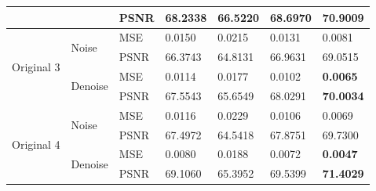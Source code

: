 \begin{center}
\begin{tabular}{llllllllllll|l|l|l|l|l|l|l|l|l|l|l|l|l|}
\multicolumn{4}{|l|}{}                            & \multicolumn{4}{l|}{}                         & \multicolumn{4}{l|}{PSNR} & \multicolumn{3}{l|}{68.2338} & \multicolumn{3}{l|}{66.5220} & \multicolumn{4}{l|}{68.6970}  & \multicolumn{3}{l|}{\textbf{70.9009}} \\ \hline
\multicolumn{4}{|l|}{\multirow{4}{*}{Original 3}} & \multicolumn{4}{l|}{\multirow{2}{*}{Noise}}   & \multicolumn{4}{l|}{MSE}  & \multicolumn{3}{l|}{0.0150}  & \multicolumn{3}{l|}{0.0215}  & \multicolumn{4}{l|}{0.0131}   & \multicolumn{3}{l|}{0.0081}           \\ \cline{9-25} 
\multicolumn{4}{|l|}{}                            & \multicolumn{4}{l|}{}                         & \multicolumn{4}{l|}{PSNR} & \multicolumn{3}{l|}{66.3743} & \multicolumn{3}{l|}{64.8131} & \multicolumn{4}{l|}{66.9631}  & \multicolumn{3}{l|}{69.0515}          \\ \cline{5-25} 
\multicolumn{4}{|l|}{}                            & \multicolumn{4}{l|}{\multirow{2}{*}{Denoise}} & \multicolumn{4}{l|}{MSE}  & \multicolumn{3}{l|}{0.0114}  & \multicolumn{3}{l|}{0.0177}  & \multicolumn{4}{l|}{0.0102}   & \multicolumn{3}{l|}{\textbf{0.0065}}  \\ \cline{9-25} 
\multicolumn{4}{|l|}{}                            & \multicolumn{4}{l|}{}                         & \multicolumn{4}{l|}{PSNR} & \multicolumn{3}{l|}{67.5543} & \multicolumn{3}{l|}{65.6549} & \multicolumn{4}{l|}{68.0291}  & \multicolumn{3}{l|}{\textbf{70.0034}} \\ \hline
\multicolumn{4}{|l|}{\multirow{4}{*}{Original 4}} & \multicolumn{4}{l|}{\multirow{2}{*}{Noise}}   & \multicolumn{4}{l|}{MSE}  & \multicolumn{3}{l|}{0.0116}  & \multicolumn{3}{l|}{0.0229}  & \multicolumn{4}{l|}{0.0106}   & \multicolumn{3}{l|}{0.0069}           \\ \cline{9-25} 
\multicolumn{4}{|l|}{}                            & \multicolumn{4}{l|}{}                         & \multicolumn{4}{l|}{PSNR} & \multicolumn{3}{l|}{67.4972} & \multicolumn{3}{l|}{64.5418} & \multicolumn{4}{l|}{67.8751}  & \multicolumn{3}{l|}{69.7300}          \\ \cline{5-25} 
\multicolumn{4}{|l|}{}                            & \multicolumn{4}{l|}{\multirow{2}{*}{Denoise}} & \multicolumn{4}{l|}{MSE}  & \multicolumn{3}{l|}{0.0080}  & \multicolumn{3}{l|}{0.0188}  & \multicolumn{4}{l|}{0.0072}   & \multicolumn{3}{l|}{\textbf{0.0047}}  \\ \cline{9-25} 
\multicolumn{4}{|l|}{}                            & \multicolumn{4}{l|}{}                         & \multicolumn{4}{l|}{PSNR} & \multicolumn{3}{l|}{69.1060} & \multicolumn{3}{l|}{65.3952} & \multicolumn{4}{l|}{69.5399}  & \multicolumn{3}{l|}{\textbf{71.4029}} \\ \hline

\end{tabular}
\end{center}
